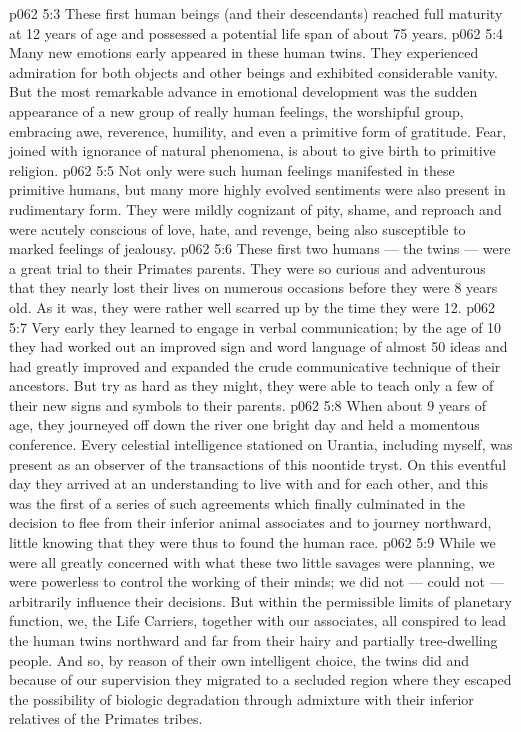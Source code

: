 \vs p062 5:3 These first human beings (and their descendants) reached full maturity at 12 years of age and possessed a potential life span of about 75 years.
\vs p062 5:4 Many new emotions early appeared in these human twins. They experienced admiration for both objects and other beings and exhibited considerable vanity. But the most remarkable advance in emotional development was the sudden appearance of a new group of really human feelings, the worshipful group, embracing awe, reverence, humility, and even a primitive form of gratitude. Fear, joined with ignorance of natural phenomena, is about to give birth to primitive religion.
\vs p062 5:5 Not only were such human feelings manifested in these primitive humans, but many more highly evolved sentiments were also present in rudimentary form. They were mildly cognizant of pity, shame, and reproach and were acutely conscious of love, hate, and revenge, being also susceptible to marked feelings of jealousy.
\vs p062 5:6 These first two humans --- the twins --- were a great trial to their Primates parents. They were so curious and adventurous that they nearly lost their lives on numerous occasions before they were 8 years old. As it was, they were rather well scarred up by the time they were 12.
\vs p062 5:7 Very early they learned to engage in verbal communication; by the age of 10 they had worked out an improved sign and word language of almost 50 ideas and had greatly improved and expanded the crude communicative technique of their ancestors. But try as hard as they might, they were able to teach only a few of their new signs and symbols to their parents.
\vs p062 5:8 When about 9 years of age, they journeyed off down the river one bright day and held a momentous conference. Every celestial intelligence stationed on Urantia, including myself, was present as an observer of the transactions of this noontide tryst. On this eventful day they arrived at an understanding to live with and for each other, and this was the first of a series of such agreements which finally culminated in the decision to flee from their inferior animal associates and to journey northward, little knowing that they were thus to found the human race.
\vs p062 5:9 While we were all greatly concerned with what these two little savages were planning, we were powerless to control the working of their minds; we did not --- could not --- arbitrarily influence their decisions. But within the permissible limits of planetary function, we, the Life Carriers, together with our associates, all conspired to lead the human twins northward and far from their hairy and partially tree\hyp{}dwelling people. And so, by reason of their own intelligent choice, the twins did  and because of our supervision they migrated  to a secluded region where they escaped the possibility of biologic degradation through admixture with their inferior relatives of the Primates tribes.
